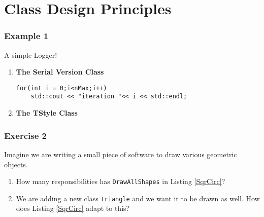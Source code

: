 \documentclass[14pt,a4paper]{article}
\begin{document}
\part*{Class Design Principles}
\label{part:all}

 
\section*{Example 1}
\large
A simple Logger!\\
 \begin{enumerate}
\item \large \textbf{The Serial Version Class}\\
  \small
  \begin{lstlisting}[float=ht,caption={\large \textbf{The Modem Class}}]
    for(int i = 0;i<nMax;i++)
    std::cout << "iteration "<< i << std::endl;
  \end{lstlisting}
  
\newpage
\item \large \textbf{The TStyle Class}\\
  \small 
  \normalsize
\end{enumerate}

\newpage
\section*{Exercise 2}
Imagine we are writing a small piece of software to draw various geometric objects.\\
\small
 
\normalsize
\begin{enumerate}
\item How many responsibilities has \texttt{DrawAllShapes} in Listing \ref{SqrCirc}?
\item We are adding a new class \texttt{Triangle} and we want it to be drawn as well. How does Listing \ref{SqrCirc} adapt to this?
\end{enumerate}

\newpage
\end{document}
